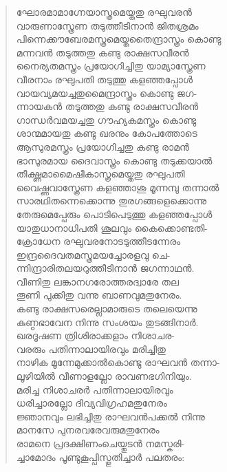\begin{verse}
ഘോരമാമാഗ്നേയാസ്ത്രമെയ്തതു രഘുവരന്‍\\
വാരുണാസ്ത്രേണ തടുത്തീടിനാന്‍ ജിതശ്രമം\\
പിന്നെക്കൗബേരമസ്ത്രമെയ്തതൈന്ദ്രാസ്ത്രം കൊണ്ടു\\
മന്നവന്‍ തടുത്തതു കണ്ടു രാക്ഷസവീരന്‍\\
നൈര്യതമസ്ത്രം പ്രയോഗിച്ചിതു യാമ്യാസ്ത്രേണ\\
വീരനാം രഘുപതി തടുത്തു കളഞ്ഞപ്പോള്‍\\
വായവ്യമയച്ചതുമൈന്ദ്രാസ്ത്രം കൊണ്ടു ജഗ-\\
ന്നായകന്‍ തടുത്തതു കണ്ടു രാക്ഷസവീരന്‍\\
ഗാന്ധര്‍വമയച്ചതു ഗൗഹ്യകമസ്ത്രം കൊണ്ടു\\
ശാന്മമായതു കണ്ടു ഖരനും കോപത്തോടെ\\
ആസുരമസ്ത്രം പ്രയോഗിച്ചതു കണ്ടു രാമന്‍\\
ഭാസുരമായ ദൈവാസ്ത്രം കൊണ്ടു തടുക്കയാല്‍\\
തീക്ഷ്ണമാമൈഷീകാസ്ത്രമെയ്തതു രഘുപതി\\
വൈഷ്ണവാസ്ത്രേണ കളഞ്ഞാശു മൂന്നമ്പു തന്നാല്‍\\
സാരഥിതന്നെക്കൊന്നു തുരഗങ്ങളെക്കൊന്നു\\
തേരുമെപ്പേരും പൊടിപെടുത്തു കളഞ്ഞപ്പോള്‍\\
യാതുധാനാധിപതി ശൂലവും കൈക്കൊണ്ടതി-\\
ക്രോധേന രഘുവരനോടടുത്തീടന്നേരം\\
ഇന്ദ്രദൈവതമസ്ത്രമയച്ചോരളവു ചെ-\\
ന്നിന്ദ്രാരിതലയറുത്തീടിനാന്‍ ജഗന്നാഥന്‍.\\
വീണിതു ലങ്കാനഗരോത്തരദ്വാരേ തല\\
തൂണി പുക്കിതു വന്നു ബാണവുമതുനേരം.\\
കണ്ടു രാക്ഷസരെല്ലാമാരുടെ തലെയെന്നു\\
കുണ്ഠഭാവേന നിന്നു സംശയം തുടങ്ങിനാര്‍.\\
ഖരദൂഷണ ത്രിശിരാക്കളാം നിശാചര-\\
വരരും പതിന്നാലായിരവും മരിച്ചിതു\\
നാഴിക മൂന്നേമുക്കാല്‍കൊണ്ടു രാഘവന്‍ തന്നാ-\\
ലൂഴിയില്‍ വീണാളല്ലോ രാവണഭഗിനിയും.\\
മരിച്ച നിശാചരര്‍ പതിന്നാലായിരവും\\
ധരിച്ചാരല്ലോ ദിവ്യവിഗ്രഹമതുനേരം\\
ജ്ഞാനവും ലഭിച്ചിതു രാഘവന്‍പക്കല്‍ നിന്നു\\
മാനസേ പുനരവരേവരുമതുനേരം\\
രാമനെ പ്രദക്ഷിണംചെയ്തുടന്‍ നമസ്കരി-\\
ച്ചാമോദം പൂണ്ടുകൂപ്പിസ്തുതിച്ചാര്‍ പലതരം:\\

\end{verse}
